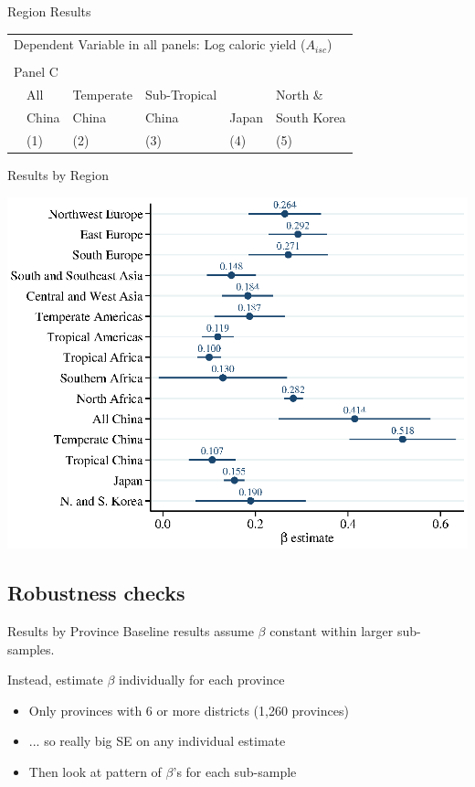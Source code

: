 \documentclass[10pt, xcolor=dvipsnames]{beamer}
\begin{document}
\begin{frame}{Region Results}

{\footnotesize
\begin{tabularx}{\textwidth}{lXXXXX}
\midrule
\multicolumn{6}{l}{Dependent Variable in all panels: Log caloric yield ($A_{isc}$)} \\ \\
\multicolumn{6}{l}{Panel C} \\
 & All& Temperate & Sub-Tropical & & North \& \\
 & China & China  & China & Japan & South Korea  \\
 & (1) & (2) & (3) & (4) & (5) \\
\midrule

\midrule
\end{tabularx}
}

\end{frame}

\begin{frame}{Results by Region}
\begin{center}
\includegraphics[width=.8\textwidth]{fig_coef_subregion_base.eps}
\end{center}
\end{frame}


\subsection{Robustness checks}

\begin{frame}{Results by Province}\label{prov}
Baseline results assume $\beta$ constant within larger sub-samples. 

\vspace{.2cm}Instead, estimate $\beta$ individually for each province
\begin{itemize}
  \item Only provinces with 6 or more districts (1,260 provinces)
  \item ... so really big SE on any individual estimate
  \item Then look at pattern of $\beta$'s for each sub-sample
\end{itemize}
\end{frame}
\end{document}
